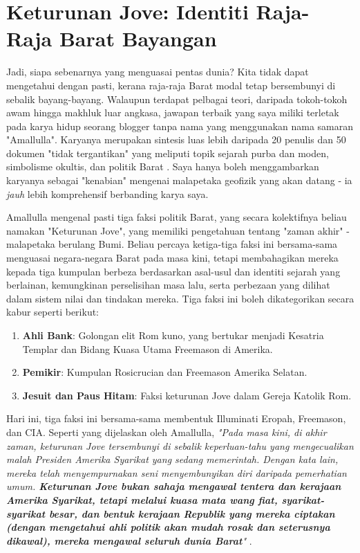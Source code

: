 \documentclass[10pt,twocolumn,letterpaper]{article}
\begin{document}
\section{Keturunan Jove: Identiti Raja-Raja Barat Bayangan}

Jadi, siapa sebenarnya yang menguasai pentas dunia? Kita tidak dapat mengetahui dengan pasti, kerana raja-raja Barat modal tetap bersembunyi di sebalik bayang-bayang. Walaupun terdapat pelbagai teori, daripada tokoh-tokoh awam hingga makhluk luar angkasa, jawapan terbaik yang saya miliki terletak pada karya hidup seorang blogger tanpa nama yang menggunakan nama samaran "Amallulla". Karyanya merupakan sintesis luas lebih daripada 20 penulis dan 50 dokumen "tidak tergantikan" yang meliputi topik sejarah purba dan moden, simbolisme okultis, dan politik Barat \cite{33,34}. Saya hanya boleh menggambarkan karyanya sebagai "kenabian" mengenai malapetaka geofizik yang akan datang - ia \textit{jauh} lebih komprehensif berbanding karya saya.

Amallulla mengenal pasti tiga faksi politik Barat, yang secara kolektifnya beliau namakan "Keturunan Jove", yang memiliki pengetahuan tentang "zaman akhir" - malapetaka berulang Bumi. Beliau percaya ketiga-tiga faksi ini bersama-sama menguasai negara-negara Barat pada masa kini, tetapi membahagikan mereka kepada tiga kumpulan berbeza berdasarkan asal-usul dan identiti sejarah yang berlainan, kemungkinan perselisihan masa lalu, serta perbezaan yang dilihat dalam sistem nilai dan tindakan mereka.
Tiga faksi ini boleh dikategorikan secara kabur seperti berikut:

\begin{flushleft}
\begin{enumerate}
    \item \textbf{Ahli Bank}: Golongan elit Rom kuno, yang bertukar menjadi Kesatria Templar dan Bidang Kuasa Utama Freemason di Amerika.
    \item \textbf{Pemikir}: Kumpulan Rosicrucian dan Freemason Amerika Selatan.
    \item \textbf{Jesuit dan Paus Hitam}: Faksi keturunan Jove dalam Gereja Katolik Rom.
\end{enumerate}
\end{flushleft}
Hari ini, tiga faksi ini bersama-sama membentuk Illuminati Eropah, Freemason, dan CIA. Seperti yang dijelaskan oleh Amallulla, \textit{"Pada masa kini, di akhir zaman, keturunan Jove tersembunyi di sebalik keperluan-tahu yang mengecualikan malah Presiden Amerika Syarikat yang sedang memerintah. Dengan kata lain, mereka telah menyempurnakan seni menyembunyikan diri daripada pemerhatian umum. \textbf{Keturunan Jove bukan sahaja mengawal tentera dan kerajaan Amerika Syarikat, tetapi melalui kuasa mata wang fiat, syarikat-syarikat besar, dan bentuk kerajaan Republik yang mereka ciptakan (dengan mengetahui ahli politik akan mudah rosak dan seterusnya dikawal), mereka mengawal seluruh dunia Barat}"} \cite{33,34}.
\end{document}
